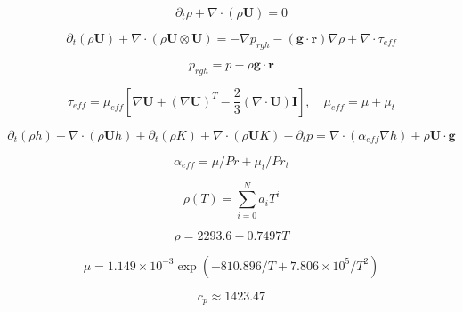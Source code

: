 \[
\partial_t\rho+\nabla\cdot(\rho\mathbf U)=0
\]

\[
\partial_t(\rho\mathbf U)+\nabla\cdot(\rho\mathbf U\otimes\mathbf U)=-\nabla p_{rgh}-(\mathbf g\cdot\mathbf r)\nabla\rho+\nabla\cdot\tau_{eff}
\]

\[
p_{rgh}=p-\rho\mathbf g\cdot\mathbf r
\]

\[
\tau_{eff}=\mu_{eff}[\nabla\mathbf U+(\nabla\mathbf U)^T-\frac23(\nabla\cdot\mathbf U)\mathbf I],\quad\mu_{eff}=\mu+\mu_t
\]

\[
\partial_t(\rho h)+\nabla\cdot(\rho\mathbf U h)+\partial_t(\rho K)+\nabla\cdot(\rho\mathbf U K)-\partial_t p=\nabla\cdot(\alpha_{eff}\nabla h)+\rho\mathbf U\cdot\mathbf g
\]

\[
\alpha_{eff}=\mu/Pr+\mu_t/Pr_t
\]

\[
\rho(T)=\sum_{i=0}^{N}a_iT^i
\]

\[
\rho=2293.6-0.7497T
\]

\[
\mu=1.149\times10^{-3}\exp(-810.896/T+7.806\times10^5/T^2)
\]

\[
c_p\approx1423.47
\]

